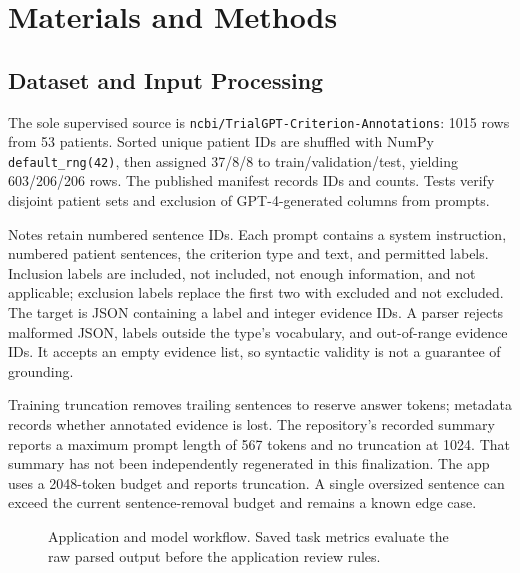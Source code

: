 \documentclass[conference]{IEEEtran}
\newcommand{\nei}{not enough information}
\begin{document}
\section{Materials and Methods}
\subsection{Dataset and Input Processing}
The sole supervised source is \texttt{ncbi/TrialGPT-Criterion-Annotations}: 1015 rows from 53 patients. Sorted unique patient IDs are shuffled with NumPy \texttt{default\_rng(42)}, then assigned 37/8/8 to train/validation/test, yielding 603/206/206 rows. The published manifest records IDs and counts. Tests verify disjoint patient sets and exclusion of GPT-4-generated columns from prompts.

Notes retain numbered sentence IDs. Each prompt contains a system instruction, numbered patient sentences, the criterion type and text, and permitted labels. Inclusion labels are included, not included, \nei{}, and not applicable; exclusion labels replace the first two with excluded and not excluded. The target is JSON containing a label and integer evidence IDs. A parser rejects malformed JSON, labels outside the type's vocabulary, and out-of-range evidence IDs. It accepts an empty evidence list, so syntactic validity is not a guarantee of grounding.

Training truncation removes trailing sentences to reserve answer tokens; metadata records whether annotated evidence is lost. The repository's recorded summary reports a maximum prompt length of 567 tokens and no truncation at 1024. That summary has not been independently regenerated in this finalization. The app uses a 2048-token budget and reports truncation. A single oversized sentence can exceed the current sentence-removal budget and remains a known edge case.

\begin{figure}[t]\centering
{}
\caption{Application and model workflow. Saved task metrics evaluate the raw parsed output before the application review rules.}\label{fig:flow}
\end{figure}
\end{document}
